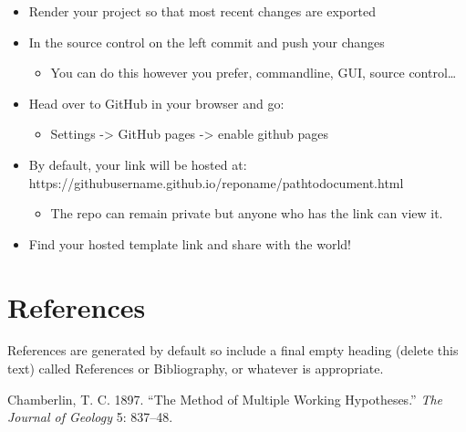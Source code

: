 \documentclass[
  letterpaper,
  DIV=11,
  numbers=noendperiod]{scrartcl}
\providecommand{\tightlist}{%
  \setlength{\itemsep}{0pt}\setlength{\parskip}{0pt}}\usepackage{longtable,booktabs,array}
\newlength{\cslhangindent}
\newlength{\cslentryspacingunit} %
\newenvironment{CSLReferences}[2] %
 {%
  \setlength{\parindent}{0pt}
  \ifodd #1
  \let\oldpar\par
  \def\par{\hangindent=\cslhangindent\oldpar}
  \fi
  \setlength{\parskip}{#2\cslentryspacingunit}
 }%
 {}
\begin{document}
\begin{tcolorbox}[enhanced jigsaw, colback=white, arc=.35mm, colframe=quarto-callout-tip-color-frame, bottomrule=.15mm, coltitle=black, rightrule=.15mm, breakable, colbacktitle=quarto-callout-tip-color!10!white, title=\textcolor{quarto-callout-tip-color}{\faLightbulb}\hspace{0.5em}{GitHub}, opacitybacktitle=0.6, bottomtitle=1mm, toptitle=1mm, leftrule=.75mm, left=2mm, opacityback=0, toprule=.15mm, titlerule=0mm]

\begin{itemize}
\item
  Render your project so that most recent changes are exported
\item
  In the source control on the left commit and push your changes

  \begin{itemize}
  \tightlist
  \item
    You can do this however you prefer, commandline, GUI, source
    control\ldots{}
  \end{itemize}
\item
  Head over to GitHub in your browser and go:

  \begin{itemize}
  \tightlist
  \item
    Settings -\textgreater{} GitHub pages -\textgreater{} enable github
    pages
  \end{itemize}
\item
  By default, your link will be hosted at:
  https://githubusername.github.io/reponame/pathtodocument.html

  \begin{itemize}
  \tightlist
  \item
    The repo can remain private but anyone who has the link can view it.
  \end{itemize}
\item
  Find your hosted template link and share with the world!
\end{itemize}

\end{tcolorbox}

\hypertarget{references}{%
\section{References}\label{references}}

References are generated by default so include a final empty heading
(delete this text) called References or Bibliography, or whatever is
appropriate.

\hypertarget{refs}{}
\begin{CSLReferences}{1}{0}
\leavevmode{}%
Chamberlin, T. C. 1897. {``The {Method} of {Multiple Working
Hypotheses}.''} \emph{The Journal of Geology} 5: 837--48.

\end{CSLReferences}
\end{document}
